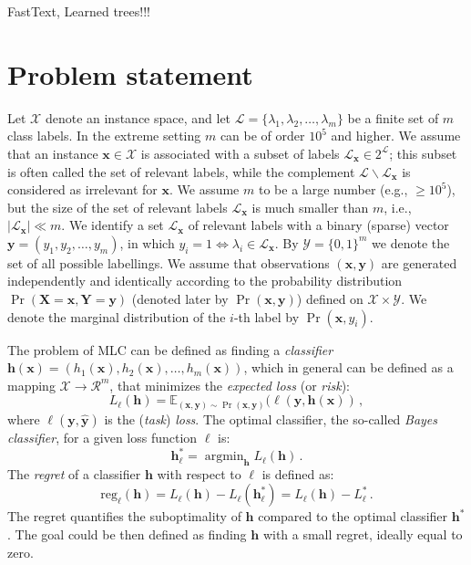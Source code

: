 \documentclass{article}
\renewcommand{\vec}[1]{\boldsymbol{#1}}
\newcommand{\bx}{\vec{x}}
\newcommand{\by}{\vec{y}}
\newcommand{\bh}{\vec{h}}
\newcommand{\bX}{\vec{X}}
\newcommand{\bY}{\vec{Y}}
\newcommand{\calX}{\mathcal{X}}
\newcommand{\calY}{\mathcal{Y}}
\newcommand{\calL}{\mathcal{L}}
\newcommand{\calR}{\mathcal{R}}
\newcommand{\reg}{\mathrm{reg}}
\newcommand{\loss}{L}
\DeclareMathOperator*{\argmin}{\arg \min}
\newcommand{\sectionBefore}{-0pt}
\newcommand{\sectionAfter}{-0pt}
\begin{document}
FastText, Learned trees!!!

\vspace{\sectionBefore}
\section{Problem statement}
\label{sec:formal}
\vspace{\sectionAfter}

Let $\calX$ denote an instance space, and let $\calL = \{\lambda_1,\lambda_2, \ldots,\lambda_m\}$ be a finite set of $m$ class labels. 
In the extreme setting $m$ can be of order $10^5$ and higher.
We assume that an instance $\bx \in \calX$ is associated with a subset of
labels $\calL_{\bx} \in 2^\calL$; this subset is often called the set of relevant labels, while the complement
$\calL \backslash \calL_{\bx}$ is considered as irrelevant for $\bx$. We assume $m$ to be a large number (e.g., $\ge 10^5$), but the size of the set of relevant labels $\calL_{\bx}$ is much smaller than $m$, i.e., $|\calL_{\bx}| \ll m$. We identify a set $\calL_{\bx}$ of relevant labels with a binary (sparse)
vector $\by = (y_1,y_2, \ldots, y_m)$, in which $y_i = 1 \Leftrightarrow \lambda_i \in \calL_{\bx}$. By $\calY = \{0, 1\}^m$ we denote the set of all
possible labellings.
We assume that observations $(\bx, \by)$ are generated independently and identically according to the
probability distribution $\Pr(\bX = \bx,\bY = \by)$ (denoted later by $\Pr(\bx, \by)$) defined on $\calX \times \calY$. We denote the marginal distribution of the $i$-th label by $\Pr(\bx,y_i)$. %

The problem of MLC can be defined as finding a  \emph{classifier} $\bh(\bx) = (h_1(\bx), h_2(\bx),\ldots, h_m(\bx))$, 
which in general can be defined as a mapping $\calX \rightarrow \calR^m$, that minimizes the \emph{expected loss} (or \emph{risk}):  
$$
\loss_\ell(\bh) = \mathbb{E}_{(\bx,\by) \sim \Pr(\bx,\by)} (\ell(\by, \bh(\bx))\,,
$$
where $\ell(\by, \hat{\by})$ is the  (\emph{task}) \emph{loss}.
%
The optimal classifier,  the so-called \emph{Bayes classifier},  for a given loss function $\ell$ is:
$$
\bh^*_\ell = \argmin_{\bh}  \loss_\ell(\bh) \,.
$$
The \emph{regret} of a classifier $\bh$ with respect to $\ell$ is defined as:
 $$
\reg_\ell(\bh) = \loss_\ell(\bh) - \loss_\ell(\bh_{\ell}^*) = \loss_\ell(\bh) - \loss_\ell^* \,.
$$
The regret quantifies the suboptimality of $\bh$ compared to the optimal classifier $\bh^*$. The goal could be then defined as finding $\bh$ with a small regret, ideally equal to zero.
\end{document}
